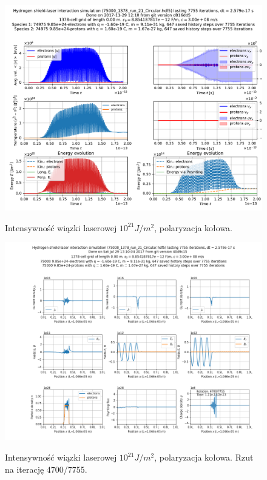 \begin{figure}[h!]
  \includegraphics[width=\textwidth]{Images/75000_1378_run_21_Circular}
  \label{fig:laser-21-Circular}
  \caption{Intensywność wiązki laserowej $10^{21} J/m^2$, polaryzacja kołowa.}
\end{figure}

\begin{figure}[h!]
  \includegraphics[width=\textwidth]{Images/75000_1378_run_21_Circular_004700}
  \label{fig:laser-21-Circular-snapshot}
  \caption{Intensywność wiązki laserowej $10^{21} J/m^2$, polaryzacja kołowa. Rzut na iterację 4700/7755.}
\end{figure}

